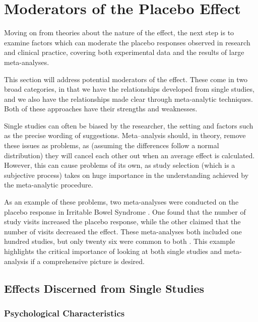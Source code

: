 \section{Moderators of the Placebo Effect}
\label{sec:moder-plac-effect}

Moving on from theories about the nature of the effect, the next step is to examine factors which can moderate the placebo responses observed in research and clinical practice, covering both experimental data and the results of large meta-analyses. 


This section will address potential moderators of the effect. These come in two broad categories, in that we have the relationships developed from single studies, and we also have the relationships made clear through meta-analytic techniques. Both of these approaches have their strengths and weaknesses. 

Single studies can often be biased by the researcher, the setting and factors such as the precise wording of suggestions. Meta--analysis should, in theory, remove these issues as problems, as (assuming the differences follow a normal distribution) they will cancel each other out when an average effect is calculated. However, this can cause problems of its own, as study selection (which is a subjective process) takes on huge importance in the understanding achieved by the meta-analytic procedure.  

As an example of these problems, two meta-analyses were conducted on the placebo response in Irritable Bowel Syndrome \cite{Patel2005,Enck2005}. One found that the number of study visits increased the placebo response, while the other claimed that the number of visits decreased the effect.  These meta-analyses both included one hundred studies, but only twenty six were common to both \cite{Klosterhalfen2008}.   This example highlights the critical importance of looking at both single studies and meta-analysis  if  a comprehensive picture is desired. 
\subsection{Effects Discerned from Single Studies}
\label{sec:effects-disc-from}


\subsubsection{Psychological Characteristics}
\label{sec:psych-char}

